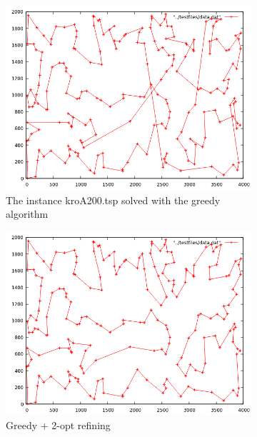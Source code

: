 \begin{figure}
	
	\centering
	\begin{subfigure}[b]{0.5\textwidth}
		\includegraphics[width=\textwidth]{images/kroA_greedy}
		\caption{The instance kroA200.tsp solved with the greedy algorithm}
	\end{subfigure}
	\bigskip
	\begin{subfigure}[b]{0.5\textwidth}
		\includegraphics[width=\textwidth]{images/2_opt}
		\caption{Greedy + 2-opt refining}
	\end{subfigure}
	\bigskip
	\begin{subfigure}[b]{0.5\textwidth}

\end{subfigure}
\end{figure}
